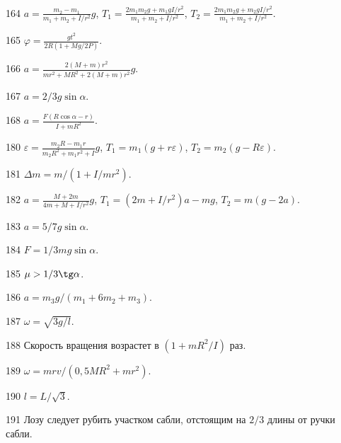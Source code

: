\begin{Answer}{164}
$a= \frac{m_2-m_1}{m_1+m_2+I/r^2}g$, $T_1 = \frac{2m_1m_2g + m_1gI/r^2}{m_1+m_2+I/r^2}$, $T_2 = \frac{2m_1m_2g + m_2gI/r^2}{m_1+m_2+I/r^2}$.
\end{Answer}
\begin{Answer}{165}
$\varphi = \frac{gt^2}{2R(1+Mg/2P)}$.
\end{Answer}
\begin{Answer}{166}
$a = \frac{2(M+m)r^2}{mr^2+MR^2+2(M+m)r^2}g$.
\end{Answer}
\begin{Answer}{167}
$a=2/3g\sin \alpha$.
\end{Answer}
\begin{Answer}{168}
$a = \frac{F(R\cos \alpha - r)}{I + mR^2}$.
\end{Answer}
\begin{Answer}{180}
$\varepsilon = \frac{m_2R - m_1r}{m_2R^2 + m_1r^2 + I}g$, $T_1 = m_1(g+r\varepsilon)$, $T_2 = m_2(g-R\varepsilon)$.
\end{Answer}
\begin{Answer}{181}
$\Delta m = m/(1+I/mr^2)$.
\end{Answer}
\begin{Answer}{182}
$a = \frac{M+2m}{4m+M+I/r^2}g$, $T_1 = (2m+I/r^2)a - mg$, $T_2=m(g-2a)$.
\end{Answer}
\begin{Answer}{183}
$a=5/7g\sin \alpha$.
\end{Answer}
\begin{Answer}{184}
$F = 1/3 mg \sin \alpha$.
\end{Answer}
\begin{Answer}{185}
$\mu > 1/3 \tg \alpha$.
\end{Answer}
\begin{Answer}{186}
$a = m_3g/(m_1 + 6m_2 +m_3)$.
\end{Answer}
\begin{Answer}{187}
$\omega = \sqrt{3g/l}$.
\end{Answer}
\begin{Answer}{188}
Скорость вращения возрастет в $(1+mR^2/I)$ раз.
\end{Answer}
\begin{Answer}{189}
$\omega = mrv/(0,5MR^2 + mr^2)$.
\end{Answer}
\begin{Answer}{190}
$l = L/\sqrt{3}$.
\end{Answer}
\begin{Answer}{191}
Лозу следует рубить участком сабли, отстоящим на $2/3$ длины от ручки сабли.
\end{Answer}
